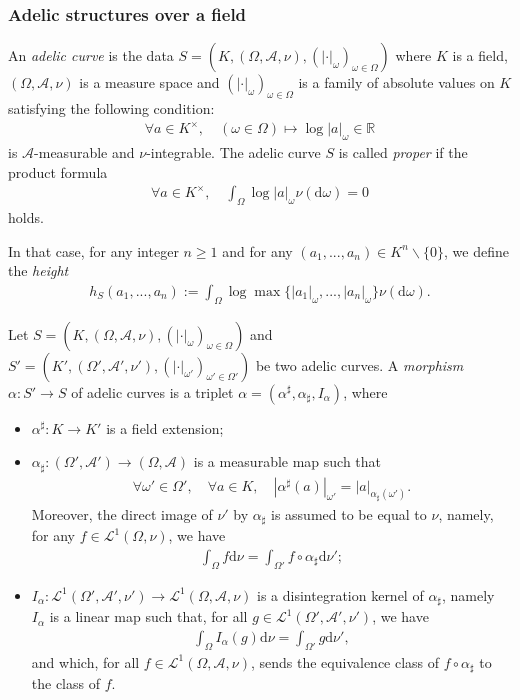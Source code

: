 \documentclass [11pt,reqno]{amsart}
\def\bR{{\mathbb{R}}}
\newcommand{\1}{\mathmybb{1}}
\def\cA{{\mathcal{A}}}
\def\cL{{\mathcal{L}}}
\def\diff{\mathrm{d}}
\def\setminus{\smallsetminus}
\newcommand{\va}{|\cdot|}
\begin{document}
\subsubsection{Adelic structures over a field}
\label{subsub:adelic_curves}

An \emph{adelic curve} is the data $S=(K,(\Omega,\cA,\nu),(\va_{\omega})_{\omega\in \Omega})$ where $K$ is a field, $(\Omega,\cA,\nu)$ is a measure space and $(\va_{\omega})_{\omega\in \Omega}$ is a family of absolute values on $K$ satisfying the following condition:
\begin{align*}
\forall a \in K^{\times}, \quad (\omega\in\Omega) \mapsto \log|a|_{\omega} \in \bR
\end{align*} 
is $\cA$-measurable and $\nu$-integrable. The adelic curve $S$ is called \emph{proper} if the product formula
\begin{align*}
\forall a\in K^{\times},\quad \int_{\Omega}\log|a|_{\omega} \nu(\diff\omega) = 0 
\end{align*}
holds. 

In that case, for any integer $n\geq 1$ and for any $(a_1,...,a_n)\in K^{n}\setminus \{0\}$, we define the \emph{height} 
\begin{align*}
h_{S}(a_1,...,a_n) := \int_{\Omega} \log\max\{|a_1|_{\omega},...,|a_n|_{\omega}\}\nu(\diff\omega). 
\end{align*}

Let $S=(K,(\Omega,\cA,\nu),(\va_{\omega})_{\omega\in \Omega})$ and $S'=(K',(\Omega',\cA',\nu'),(\va_{\omega'})_{\omega'\in \Omega'})$ be two adelic curves. A \emph{morphism} $\alpha : S' \to S$ of adelic curves is a triplet $\alpha=(\alpha^{\sharp},\alpha_{\sharp},I_{\alpha})$, where
\begin{itemize}
	\item $\alpha^{\sharp} : K \to K'$ is a field extension;
	\item $\alpha_{\sharp} : (\Omega',\cA') \to (\Omega,\cA)$ is a measurable map such that 
	\begin{align*}
	\forall \omega'\in \Omega', \quad \forall a\in K,\quad |\alpha^{\sharp}(a)|_{\omega'} = |a|_{\alpha_{\sharp}(\omega')}.
	\end{align*}
	Moreover, the direct image of $\nu'$ by $\alpha_{\sharp}$ is assumed to be equal to $\nu$, namely, for any $f\in \cL^{1}(\Omega,\nu)$, we have
\begin{align*}
\int_{\Omega}f\diff\nu = \int_{\Omega'} f\circ \alpha_{\sharp}\diff\nu';
\end{align*}
	\item  $I_{\alpha} : \cL^1(\Omega',\cA',\nu') \rightarrow \cL^1(\Omega,\cA,\nu)$ is a disintegration kernel of $\alpha_{\sharp}$, namely $I_{\alpha}$ is a linear map such that, for all $g\in \cL^{1}(\Omega',\cA',\nu')$, we have
	\begin{align*}
	\int_{\Omega} I_{\alpha}(g)\diff\nu = \int_{\Omega'} g\diff\nu',
	\end{align*}
and which, for all $f \in \cL^{1}(\Omega,\cA,\nu)$, sends the equivalence class of $f\circ \alpha_{\sharp}$ to the class of $f$.
\end{itemize}
\end{document}
